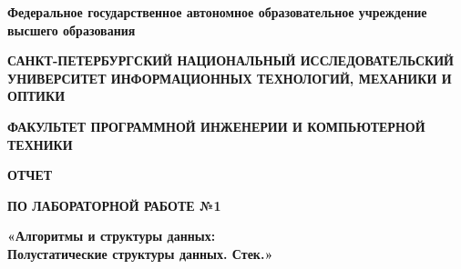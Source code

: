 \documentclass[12pt]{article}
\begin{document}
\setlength{\parindent}{0pt}
\pagestyle{empty}
\begin{center}
\normalsize
\textbf{Федеральное государственное автономное образовательное учреждение высшего образования}

\small
\medskip 
\textbf{САНКТ-ПЕТЕРБУРГСКИЙ НАЦИОНАЛЬНЫЙ ИССЛЕДОВАТЕЛЬСКИЙ  УНИВЕРСИТЕТ ИНФОРМАЦИОННЫХ ТЕХНОЛОГИЙ, МЕХАНИКИ И ОПТИКИ}

\medskip 
\textbf{ФАКУЛЬТЕТ ПРОГРАММНОЙ ИНЖЕНЕРИИ И КОМПЬЮТЕРНОЙ ТЕХНИКИ}
\end{center}
\bigskip\bigskip\bigskip\bigskip\bigskip\bigskip\bigskip\bigskip\bigskip\bigskip\bigskip\bigskip
\begin{center}
\par\medskip\par\smallskip
\Large
 
\par\smallskip
\textbf{ОТЧЕТ} 

\textbf{ПО ЛАБОРАТОРНОЙ РАБОТЕ №1}

\large
\par\bigskip
\textbf{«Алгоритмы и структуры данных: \\ Полустатические структуры данных. Стек.»}
\par\bigskip\par\bigskip\par\bigskip\par\bigskip\par\bigskip\par\bigskip
\par\bigskip\par\bigskip\par\bigskip\par\bigskip\par\bigskip\par\bigskip
\par\bigskip\par\bigskip\par\bigskip\par\bigskip\par\bigskip\par\bigskip
\end{center}
\end{document}
